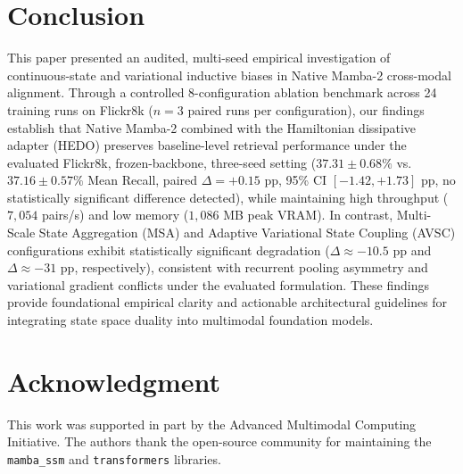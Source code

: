 \documentclass[10pt,journal,final]{IEEEtran}
\begin{document}
\section{Conclusion}
\label{sec:conclusion}
This paper presented an audited, multi-seed empirical investigation of continuous-state and variational inductive biases in Native Mamba-2 cross-modal alignment. Through a controlled 8-configuration ablation benchmark across 24 training runs on Flickr8k ($n=3$ paired runs per configuration), our findings establish that Native Mamba-2 combined with the Hamiltonian dissipative adapter (HEDO) preserves baseline-level retrieval performance under the evaluated Flickr8k, frozen-backbone, three-seed setting ($37.31 \pm 0.68\%$ vs. $37.16 \pm 0.57\%$ Mean Recall, paired $\Delta = +0.15$ pp, 95\% CI $[-1.42, +1.73]$ pp, no statistically significant difference detected), while maintaining high throughput ($7,054$ pairs/s) and low memory ($1,086$ MB peak VRAM). In contrast, Multi-Scale State Aggregation (MSA) and Adaptive Variational State Coupling (AVSC) configurations exhibit statistically significant degradation ($\Delta \approx -10.5$ pp and $\Delta \approx -31$ pp, respectively), consistent with recurrent pooling asymmetry and variational gradient conflicts under the evaluated formulation. These findings provide foundational empirical clarity and actionable architectural guidelines for integrating state space duality into multimodal foundation models.

\section*{Acknowledgment}
This work was supported in part by the Advanced Multimodal Computing Initiative. The authors thank the open-source community for maintaining the \texttt{mamba\_ssm} and \texttt{transformers} libraries.



\end{document}
